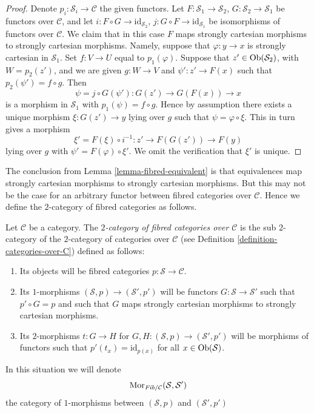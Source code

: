 \begin{proof}
Denote $p_i : \mathcal{S}_i \to \mathcal{C}$ the given functors.
Let $F : \mathcal{S}_1 \to \mathcal{S}_2$,
$G : \mathcal{S}_2 \to \mathcal{S}_1$ be functors over $\mathcal{C}$, and let
$i : F \circ G \to \text{id}_{\mathcal{S}_2}$,
$j : G \circ F \to \text{id}_{\mathcal{S}_1}$ be isomorphisms of
functors over $\mathcal{C}$.
We claim that in this case $F$ maps strongly cartesian morphisms
to strongly cartesian morphisms. Namely, suppose that
$\varphi : y \to x$ is strongly cartesian in $\mathcal{S}_1$.
Set $f : V \to U$ equal to $p_1(\varphi)$. Suppose that
$z' \in \mathop{\mathrm{Ob}}\nolimits(\mathcal{S}_2)$, with $W = p_2(z')$, and we are given
$g : W \to V$ and $\psi' : z' \to F(x)$ such that
$p_2(\psi') = f \circ g$. Then
$$
\psi = j \circ G(\psi') : G(z') \to G(F(x)) \to x
$$
is a morphism in $\mathcal{S}_1$ with $p_1(\psi) = f \circ g$.
Hence by assumption there exists a unique morphism $\xi : G(z') \to y$
lying over $g$ such that $\psi = \varphi \circ \xi$. This in turn gives a
morphism
$$
\xi' = F(\xi) \circ i^{-1} : z' \to F(G(z')) \to F(y)
$$
lying over $g$ with $\psi' = F(\varphi) \circ \xi'$. We omit the verification
that $\xi'$ is unique.
\end{proof}

\noindent
The conclusion from Lemma \ref{lemma-fibred-equivalent} is that
equivalences map strongly cartesian morphisms to strongly cartesian
morphisms. But this may not be the case for an arbitrary functor between
fibred categories over $\mathcal{C}$. Hence we define the $2$-category
of fibred categories as follows.

\begin{definition}
\label{definition-fibred-categories-over-C}
Let $\mathcal{C}$ be a category.
The {\it $2$-category of fibred categories over $\mathcal{C}$}
is the sub $2$-category of the $2$-category of categories
over $\mathcal{C}$ (see Definition \ref{definition-categories-over-C})
defined as follows:
\begin{enumerate}
\item Its objects will be fibred categories
$p : \mathcal{S} \to \mathcal{C}$.
\item Its $1$-morphisms $(\mathcal{S}, p) \to (\mathcal{S}', p')$
will be functors $G : \mathcal{S} \to \mathcal{S}'$ such that
$p' \circ G = p$ and such that $G$ maps strongly cartesian
morphisms to strongly cartesian morphisms.
\item Its $2$-morphisms $t : G \to H$ for
$G, H : (\mathcal{S}, p) \to (\mathcal{S}', p')$
will be morphisms of functors
such that $p'(t_x) = \text{id}_{p(x)}$
for all $x \in \mathop{\mathrm{Ob}}\nolimits(\mathcal{S})$.
\end{enumerate}
In this situation we will denote
$$
\mathop{\mathrm{Mor}}\nolimits_{\textit{Fib}/\mathcal{C}}(\mathcal{S}, \mathcal{S}')
$$
the category of $1$-morphisms between
$(\mathcal{S}, p)$ and $(\mathcal{S}', p')$
\end{definition}

